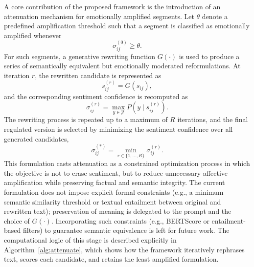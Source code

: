 \documentclass[final,1p,times]{elsarticle}
\begin{document}
A core contribution of the proposed framework is the introduction of an attenuation mechanism for emotionally amplified segments. Let $\theta$ denote a predefined amplification threshold such that a segment is classified as emotionally amplified whenever
\begin{equation}
\sigma^{(0)}_{ij} \ge \theta.
\end{equation}
For such segments, a generative rewriting function $G(\cdot)$ is used to produce a series of semantically equivalent but emotionally moderated reformulations. At iteration $r$, the rewritten candidate is represented as
\begin{equation}
s^{(r)}_{ij} = G(s_{ij}),
\end{equation}
and the corresponding sentiment confidence is recomputed as
\begin{equation}
\sigma^{(r)}_{ij} = \max_{y \in \mathcal{Y}} P(y \mid s^{(r)}_{ij}).
\end{equation}
The rewriting process is repeated up to a maximum of $R$ iterations, and the final regulated version is selected by minimizing the sentiment confidence over all generated candidates,
\begin{equation}
\sigma^{(*)}_{ij} = \min_{r \in \{1,\dots,R\}} \sigma^{(r)}_{ij}.
\end{equation}
This formulation casts attenuation as a constrained optimization process in which the objective is not to erase sentiment, but to reduce unnecessary affective amplification while preserving factual and semantic integrity. The current formulation does not impose explicit formal constraints (e.g., a minimum semantic similarity threshold or textual entailment between original and rewritten text); preservation of meaning is delegated to the prompt and the choice of $G(\cdot)$. Incorporating such constraints (e.g., BERTScore or entailment-based filters) to guarantee semantic equivalence is left for future work. The computational logic of this stage is described explicitly in Algorithm~\ref{alg:attenuate}, which shows how the framework iteratively rephrases text, scores each candidate, and retains the least amplified formulation.
\end{document}
